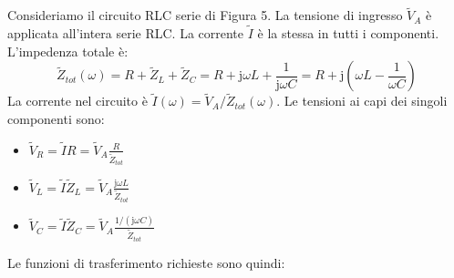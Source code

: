 \documentclass[a4paper, 11pt]{article}
\newcommand{\jj}{\mathrm{j}} %
\begin{document}
Consideriamo il circuito RLC serie di Figura 5. La tensione di ingresso $\tilde{V}_A$ è applicata all'intera serie RLC. La corrente $\tilde{I}$ è la stessa in tutti i componenti. L'impedenza totale è:
\begin{equation}
    \tilde{Z}_{tot}(\omega) = R + \tilde{Z}_L + \tilde{Z}_C = R + \jj \omega L + \frac{1}{\jj \omega C} = R + \jj \left( \omega L - \frac{1}{\omega C} \right)
\end{equation}
La corrente nel circuito è $\tilde{I}(\omega) = \tilde{V}_A / \tilde{Z}_{tot}(\omega)$.
Le tensioni ai capi dei singoli componenti sono:
\begin{itemize}
    \item $\tilde{V}_R = \tilde{I} R = \tilde{V}_A \frac{R}{\tilde{Z}_{tot}}$
    \item $\tilde{V}_L = \tilde{I} \tilde{Z}_L = \tilde{V}_A \frac{\jj \omega L}{\tilde{Z}_{tot}}$
    \item $\tilde{V}_C = \tilde{I} \tilde{Z}_C = \tilde{V}_A \frac{1/(\jj \omega C)}{\tilde{Z}_{tot}}$
\end{itemize}
Le funzioni di trasferimento richieste sono quindi:
\end{document}
